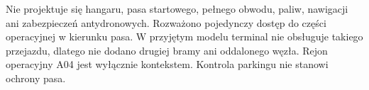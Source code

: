 Nie projektuje się hangaru, pasa startowego, pełnego obwodu, paliw, nawigacji ani zabezpieczeń antydronowych. Rozważono pojedynczy dostęp do części operacyjnej w kierunku pasa. W przyjętym modelu terminal nie obsługuje takiego przejazdu, dlatego nie dodano drugiej bramy ani oddalonego węzła. Rejon operacyjny A04 jest wyłącznie kontekstem. Kontrola parkingu nie stanowi ochrony pasa.
